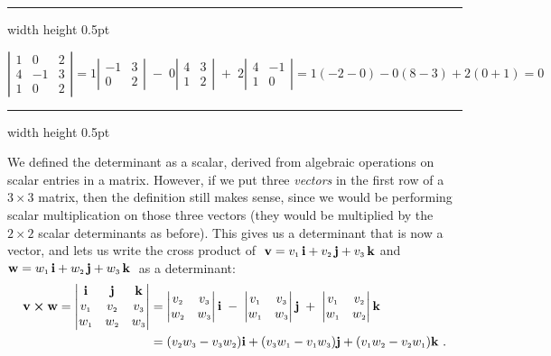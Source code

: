 \vspace{3mm}
\hrule width \textwidth height 0.5pt
\begin{exmp}
 \begin{displaymath}
  \left|
  \begin{array}{rrr}
   1 & 0 & 2\\
   4 & -1 & 3\\
   1 & 0 & 2
  \end{array}\right|
  = 1 \left|\begin{array}{rr} -1 & 3 \\ 0 & 2 \end{array}\right| \;-\;
  0 \left|\begin{array}{rr} 4 & 3 \\ 1 & 2 \end{array}\right| \;+\;
  2 \left|\begin{array}{rr} 4 & -1 \\ 1 & 0 \end{array}\right|
  = 1(-2 - 0) - 0(8 - 3) + 2(0 + 1) = 0
 \end{displaymath}
\end{exmp}
\hrule width \textwidth height 0.5pt
\vspace{2mm}

We defined the determinant as a scalar, derived from algebraic operations on scalar entries in a matrix. However,
if we put three \emph{vectors} in the first row of a $3 \times 3$ matrix, then the definition still
makes sense, since we would be performing scalar multiplication on those three vectors (they would be multiplied by
the $2 \times 2$ scalar determinants as before). This gives us a determinant that is now a vector, and lets us write the
cross product of $\;\textbf{v} = v_{\scriptscriptstyle 1}\,\textbf{i} + v_{\scriptscriptstyle 2}\,\textbf{j} + v_{\scriptscriptstyle 3}\,\textbf{k}$ and $\textbf{w} = w_{\scriptscriptstyle 1}\,\textbf{i} + w_{\scriptscriptstyle 2}\,\textbf{j} + w_{\scriptscriptstyle 3}\,\textbf{k}\;$ as a determinant:
\begin{align*}
 \textbf{v} \bm{\times} \textbf{w} =
 \begin{vmatrix}
  \textbf{i} & \textbf{j} & \textbf{k} \\ v_{\scriptscriptstyle 1} & v_{\scriptscriptstyle 2} & v_{\scriptscriptstyle 3} \\
  w_{\scriptscriptstyle 1} & w_{\scriptscriptstyle 2} & w_{\scriptscriptstyle 3}
 \end{vmatrix} &= \begin{vmatrix} v_{\scriptscriptstyle 2} & v_{\scriptscriptstyle 3} \\ w_{\scriptscriptstyle 2} & w_{\scriptscriptstyle 3} \end{vmatrix} \textbf{i} \;-\;
 \begin{vmatrix} v_{\scriptscriptstyle 1} & v_{\scriptscriptstyle 3} \\ w_{\scriptscriptstyle 1} & w_{\scriptscriptstyle 3} \end{vmatrix} \textbf{j} \;+\;
 \begin{vmatrix} v_{\scriptscriptstyle 1} & v_{\scriptscriptstyle 2} \\ w_{\scriptscriptstyle 1} & w_{\scriptscriptstyle 2} \end{vmatrix} \textbf{k}\\
 &= (v_{\scriptscriptstyle 2}w_{\scriptscriptstyle 3} -
v_{\scriptscriptstyle 3}w_{\scriptscriptstyle 2})\textbf{i} + (v_{\scriptscriptstyle 3}w_{\scriptscriptstyle 1} - v_{\scriptscriptstyle 1}w_{\scriptscriptstyle 3})\textbf{j} +
(v_{\scriptscriptstyle 1}w_{\scriptscriptstyle 2} - v_{\scriptscriptstyle 2}w_{\scriptscriptstyle 1})\textbf{k} ~.
\end{align*}

